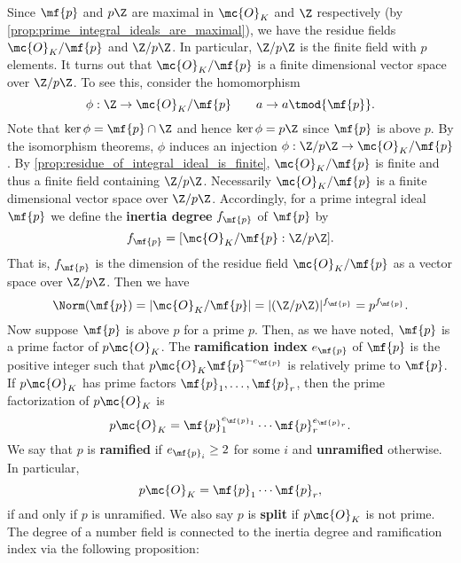     Since $\mf{p}$ and $p\Z$ are maximal in $\mc{O}_{K}$ and $\Z$ respectively (by \cref{prop:prime_integral_ideals_are_maximal}), we have the residue fields $\mc{O}_{K}/\mf{p}$ and $\Z/p\Z$. In particular, $\Z/p\Z$ is the finite field with $p$ elements. It turns out that $\mc{O}_{K}/\mf{p}$ is a finite dimensional vector space over $\Z/p\Z$. To see this, consider the homomorphism
    \[
      \phi:\Z \to \mc{O}_{K}/\mf{p} \qquad a \to a \tmod{\mf{p}}.
    \]
    Note that $\ker\phi = \mf{p} \cap \Z$ and hence $\ker\phi = p\Z$ since $\mf{p}$ is above $p$. By the isomorphism theorems, $\phi$ induces an injection $\phi:\Z/p\Z \to \mc{O}_{K}/\mf{p}$. By \cref{prop:residue_of_integral_ideal_is_finite}, $\mc{O}_{K}/\mf{p}$ is finite and thus a finite field containing $\Z/p\Z$. Necessarily $\mc{O}_{K}/\mf{p}$ is a finite dimensional vector space over $\Z/p\Z$. Accordingly, for a prime integral ideal $\mf{p}$ we define the \textbf{inertia degree} $f_{\mf{p}}$ of $\mf{p}$ by
    \[
      f_{\mf{p}} = [\mc{O}_{K}/\mf{p}:\Z/p\Z].
    \]
    That is, $f_{\mf{p}}$ is the dimension of the residue field $\mc{O}_{K}/\mf{p}$ as a vector space over $\Z/p\Z$. Then we have
    \[
      \Norm(\mf{p}) = |\mc{O}_{K}/\mf{p}| = |(\Z/p\Z)|^{f_{\mf{p}}} = p^{f_{\mf{p}}}.
    \]
    Now suppose $\mf{p}$ is above $p$ for a prime $p$. Then, as we have noted, $\mf{p}$ is a prime factor of $p\mc{O}_{K}$. The \textbf{ramification index} $e_{\mf{p}}$ of $\mf{p}$ is the positive integer such that $p\mc{O}_{K}\mf{p}^{-e_{\mf{p}}}$ is relatively prime to $\mf{p}$. If $p\mc{O}_{K}$ has prime factors $\mf{p}_{1},\ldots,\mf{p}_{r}$, then the prime factorization of $p\mc{O}_{K}$ is
    \[
      p\mc{O}_{K} = \mf{p}_{1}^{e_{\mf{p}_{1}}} \cdots \mf{p}_{r}^{e_{\mf{p}_{r}}}.
    \]
    We say that $p$ is \textbf{ramified} if $e_{\mf{p}_{i}} \ge 2$ for some $i$ and \textbf{unramified} otherwise. In particular,
    \[
      p\mc{O}_{K} = \mf{p}_{1} \cdots \mf{p}_{r},
    \]
    if and only if $p$ is unramified. We also say $p$ is \textbf{split} if $p\mc{O}_{K}$ is not prime. The degree of a number field is connected to the inertia degree and ramification index via the following proposition:

